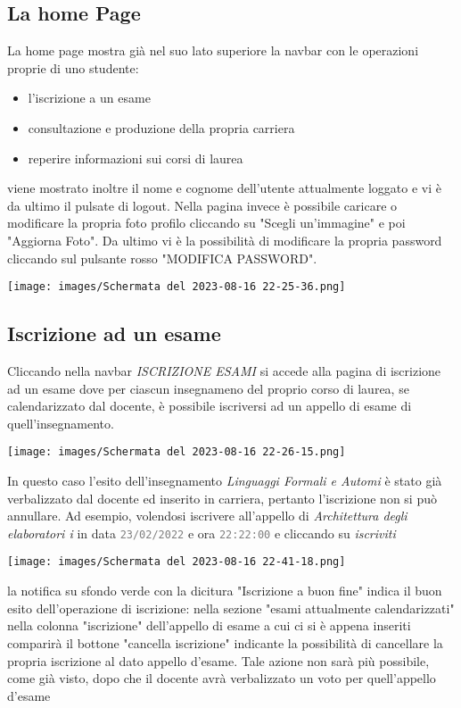\documentclass{article}
\newcommand{\attr}[1]{\texttt{\textcolor{gray}{#1}}}
\begin{document}
    \subsection{La home Page}
    La home page mostra già nel suo lato superiore la navbar con le operazioni proprie di uno studente:
    \begin{itemize}
        \item l'iscrizione a un esame
        \item consultazione e produzione della propria carriera
        \item reperire informazioni sui corsi di laurea
    \end{itemize}
    viene mostrato inoltre il nome e cognome dell'utente attualmente loggato e vi è da ultimo il pulsate di logout.
    Nella pagina invece è possibile caricare o modificare la propria foto profilo cliccando su "Scegli un'immagine" e poi "Aggiorna Foto".
    Da ultimo vi è la possibilità di modificare la propria password cliccando sul pulsante rosso "MODIFICA PASSWORD".

    \texttt{[image: images/Schermata del 2023-08-16 22-25-36.png]}

    \subsection{Iscrizione ad un esame}
    Cliccando nella navbar \textit{ISCRIZIONE ESAMI} si accede alla pagina di iscrizione ad un esame dove per ciascun insegnameno del proprio corso di laurea, se calendarizzato dal docente, è possibile iscriversi ad un appello di esame di quell'insegnamento.

    \texttt{[image: images/Schermata del 2023-08-16 22-26-15.png]}

    In questo caso l'esito dell'insegnamento \textit{Linguaggi Formali e Automi} è stato già verbalizzato dal docente ed inserito in carriera, pertanto l'iscrizione non si può annullare.
    Ad esempio, volendosi iscrivere all'appello di \textit{Architettura degli elaboratori i} in data \attr{23/02/2022} e ora \attr{22:22:00} e cliccando su \textit{iscriviti}

    \texttt{[image: images/Schermata del 2023-08-16 22-41-18.png]}

    la notifica su sfondo verde con la dicitura "Iscrizione a buon fine" indica il buon esito dell'operazione di iscrizione: nella sezione "esami attualmente calendarizzati" nella colonna "iscrizione" dell'appello di esame a cui ci si è appena inseriti comparirà il bottone "cancella iscrizione" indicante la possibilità di cancellare la propria iscrizione al dato appello d'esame. Tale azione non sarà più possibile, come già visto, dopo che il docente avrà verbalizzato un voto per quell'appello d'esame
\end{document}
